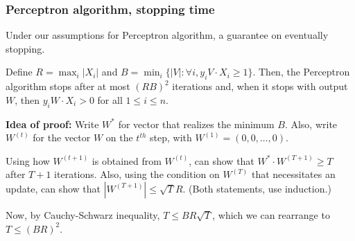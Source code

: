 \documentclass{beamer}
\theoremstyle{example}
\begin{document}
\begin{frame}
    \frametitle{Perceptron algorithm, stopping time}
    Under our assumptions for Perceptron algorithm, a guarantee on eventually stopping.

    \begin{theorem}Define $R = \max_i|X_i|$ and $B = \min_i\{|V|: \forall i, y_iV\cdot X_i \ge 1\}$. Then, the Perceptron algorithm stops after at most $(RB)^2$ iterations and, when it stops with output $W$, then $y_iW\cdot X_i > 0$ for all $1\le i\le n$.
    \end{theorem}

    \pause 
    \textbf{Idea of proof:} Write $W^*$ for vector that realizes the minimum $B$. Also, write $W^{(t)}$ for the vector $W$ on the $t^{th}$ step, with $W^{(1)} = (0,0,\ldots,0)$.

    \pause
    Using how $W^{(t+1)}$ is obtained from $W^{(t)}$, can show that $W^*\cdot W^{(T+1)} \ge T$ after $T+1$ iterations. Also, using the condition on $W^{(T)}$ that necessitates an update, can show that $|W^{(T+1)}| \le \sqrt{T}R$. (Both statements, use induction.) 

    \pause
    Now, by Cauchy-Schwarz inequality, $T \le BR\sqrt{T}$, which we can rearrange to $T\le (BR)^2$.
\end{frame}
\end{document}
